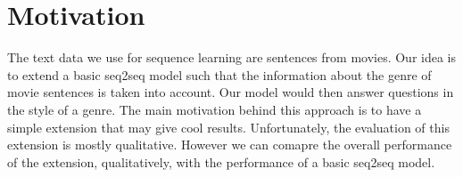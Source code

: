 \section{Motivation}

The text data we use for sequence learning are sentences from movies. Our idea is to extend a basic seq2seq model such that the information about the genre of movie sentences is taken into account. Our model would then answer questions in the style of a genre. The main motivation behind this approach is to have a simple extension that may give cool results. Unfortunately, the evaluation of this extension is mostly qualitative. However we can comapre the overall performance of the extension, qualitatively, with the performance of a basic seq2seq model.

